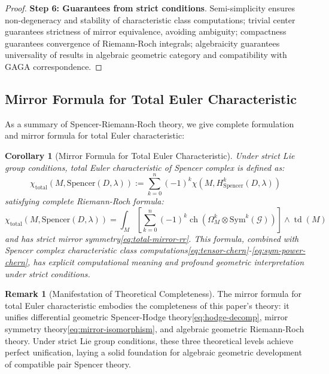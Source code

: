 \documentclass[a4paper,12pt]{extarticle}
\newtheorem{corollary}[theorem]{Corollary}
\newcommand{\ch}{\operatorname{ch}}
\newcommand{\td}{\operatorname{td}}
\theoremstyle{definition}
\newtheorem{remark}{Remark}
\begin{document}
\begin{proof}
\textbf{Step 6: Guarantees from strict conditions}. Semi-simplicity ensures non-degeneracy and stability of characteristic class computations; trivial center guarantees strictness of mirror equivalence, avoiding ambiguity; compactness guarantees convergence of Riemann-Roch integrals; algebraicity guarantees universality of results in algebraic geometric category and compatibility with GAGA correspondence.
\end{proof}

\subsection{Mirror Formula for Total Euler Characteristic}

As a summary of Spencer-Riemann-Roch theory, we give complete formulation and mirror formula for total Euler characteristic:

\begin{corollary}[Mirror Formula for Total Euler Characteristic]
Under strict Lie group conditions, total Euler characteristic of Spencer complex is defined as:
\begin{equation}\label{eq:total-euler-def}
\chi_{\mathrm{total}}(M, \mathrm{Spencer}(D,\lambda)) := \sum_{k=0}^n (-1)^k \chi(M, H^k_{\mathrm{Spencer}}(D,\lambda))
\end{equation}
satisfying complete Riemann-Roch formula:
\begin{equation}\label{eq:total-riemann-roch}
\chi_{\mathrm{total}}(M, \mathrm{Spencer}(D,\lambda)) = \int_M \left[\sum_{k=0}^n (-1)^k \ch(\Omega^k_M \otimes \mathrm{Sym}^k(\mathcal{G}))\right] \wedge \td(M)
\end{equation}
and has strict mirror symmetry\eqref{eq:total-mirror-rr}. This formula, combined with Spencer complex characteristic class computations\eqref{eq:tensor-chern}-\eqref{eq:sym-power-chern}, has explicit computational meaning and profound geometric interpretation under strict conditions.
\end{corollary}

\begin{remark}[Manifestation of Theoretical Completeness]
The mirror formula for total Euler characteristic embodies the completeness of this paper's theory: it unifies differential geometric Spencer-Hodge theory\eqref{eq:hodge-decomp}, mirror symmetry theory\eqref{eq:mirror-isomorphism}, and algebraic geometric Riemann-Roch theory. Under strict Lie group conditions, these three theoretical levels achieve perfect unification, laying a solid foundation for algebraic geometric development of compatible pair Spencer theory.
\end{remark}
\end{document}
